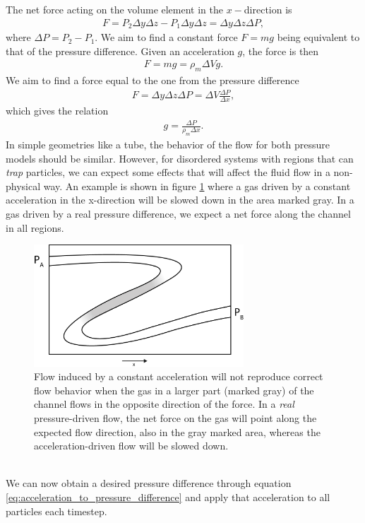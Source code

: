 The net force acting on the volume element in the $x-$direction is
\begin{align}
	F = P_2\Delta y\Delta z - P_1\Delta y\Delta z = \Delta y\Delta z\Delta P,
\end{align}
where $\Delta P = P_2 - P_1$. We aim to find a constant force $F=mg$ being equivalent to that of the pressure difference. Given an acceleration $g$, the force is then
\begin{align}
	F = mg = \rho_m \Delta V g.
\end{align}
We aim to find a force equal to the one from the pressure difference
\begin{align}
	F = \Delta y\Delta z\Delta P = \Delta V \frac{\Delta P}{\Delta x},	
\end{align}
which gives the relation
\begin{align}
	\label{eq:acceleration_to_pressure_difference}
	g = \frac{\Delta P}{\rho_m\Delta x}.
\end{align}
In simple geometries like a tube, the behavior of the flow for both pressure models should be similar. However, for disordered systems with regions that can \textit{trap} particles, we can expect some effects that will affect the fluid flow in a non-physical way. An example is shown in figure \ref{fig:gravity_problem} where a gas driven by a constant acceleration in the x-direction will be slowed down in the area marked gray. In a gas driven by a real pressure difference, we expect a net force along the channel in all regions.
\begin{figure}[h]
\begin{center}
\includegraphics[width=0.7\textwidth, trim=0cm 0cm 0cm 0cm, clip]{DSMC/figures/gravity_problem.eps}
\end{center}
\caption{Flow induced by a constant acceleration will not reproduce correct flow behavior when the gas in a larger part (marked gray) of the channel flows in the opposite direction of the force. In a \textit{real} pressure-driven flow, the net force on the gas will point along the expected flow direction, also in the gray marked area, whereas the acceleration-driven flow will be slowed down.}
\label{fig:gravity_problem}
\end{figure}
\\
We can now obtain a desired pressure difference through equation \eqref{eq:acceleration_to_pressure_difference} and apply that acceleration to all particles each timestep.